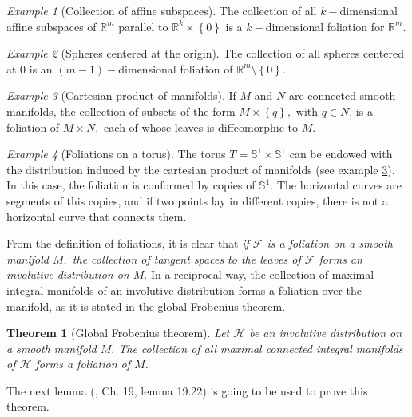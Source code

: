 \documentclass[12pt, letterpaper, reqno]{amsart}
\theoremstyle{definition}
\theoremstyle{plain}
\newtheorem{thm}{Theorem}
\theoremstyle{remark}
\newtheorem{ex}{Example}
\begin{document}
\begin{ex}[Collection of affine subspaces]
	The collection of all $ k- $dimensional affine subspaces of $ \mathbb{R}^m $ parallel to $ \mathbb{R}^k\times \left\{ 0 \right\} $ is a $ k- $dimensional foliation for $ \mathbb{R}^m. $ 
\end{ex}

\begin{ex}[Spheres centered at the origin]
	The collection of all spheres centered at $ 0 $ is an $ (m-1)- $dimensional foliation of $ \mathbb{R}^m\setminus \left\{ 0 \right\} $. 
\end{ex}

\begin{ex}[Cartesian product of manifolds]\label{ex:product_foliation}
	If $ M $ and $ N $ are connected smooth manifolds, the collection of subsets of the form $ M\times \left\{ q \right\}, $ with $ q\in N $, is a foliation of $ M\times N, $ each of whose leaves is diffeomorphic to $ M. $  	
\end{ex}

\begin{ex}[Foliations on a torus]
	The torus $ T= \mathbb{S}^1\times \mathbb{S}^1 $ can be endowed with the distribution induced by the cartesian product of manifolds (see example \ref{ex:product_foliation}). In this case, the foliation is conformed by copies of $ \mathbb{S}^1. $ The horizontal curves are segments of this copies, and if two points lay in different copies, there is not a horizontal curve that connects them.
\end{ex}

From the definition of foliations, it is clear that \textit{if $ \mathcal{F} $ is a foliation on a smooth manifold $ M, $ the collection of tangent spaces to the leaves of $ \mathcal{F} $ forms an involutive distribution on $ M. $} In a reciprocal way, the collection of maximal integral manifolds of an involutive distribution forms a foliation over the manifold, as it is stated in the global Frobenius theorem.

\begin{thm}[Global Frobenius theorem]
	Let $ \mathcal{H} $ be an involutive distribution on a smooth manifold $ M. $ The collection of all maximal connected integral manifolds of $ \mathcal{H} $ forms a foliation of $ M. $ 
\end{thm}

The next lemma (\cite{lee2003introduction}, Ch. 19, lemma 19.22) is going to be used to prove this theorem.
\end{document}
